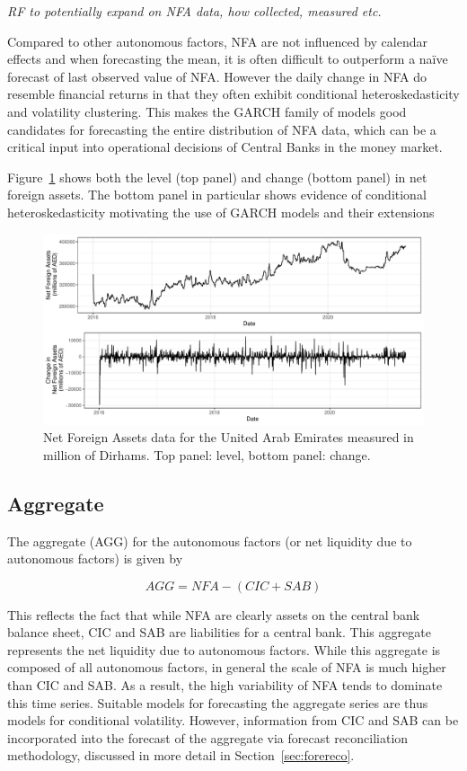 \documentclass{article}
\begin{document}
\textit{\color{blue} RF to potentially expand on NFA data, how collected, measured etc.}

Compared to other autonomous factors, NFA are not influenced by calendar effects and when forecasting the mean, it is often difficult to outperform a na\"ive forecast of last observed value of NFA. However the daily change in NFA do resemble financial returns in that they often exhibit conditional heteroskedasticity and volatility clustering. This makes the GARCH family of models good candidates for forecasting the entire distribution of NFA data, which can be a critical input into operational decisions of Central Banks in the money market.

Figure~\ref{fig:nfadata} shows both the level (top panel) and change (bottom panel) in net foreign assets. The bottom panel in particular shows evidence of conditional heteroskedasticity motivating the use of GARCH models and their extensions

\begin{figure}[!h]
    \centering
    \includegraphics[scale=0.6]{nfaplot}
    \caption{Net Foreign Assets data for the United Arab Emirates measured in million of Dirhams. Top panel: level, bottom panel: change.}
    \label{fig:nfadata}
\end{figure}

\subsection{Aggregate}

The aggregate (AGG) for the autonomous factors (or net liquidity due to autonomous factors) is given by 

\[
AGG=NFA-(CIC+SAB)
\]

This reflects the fact that while NFA are clearly assets on the central bank balance sheet, CIC and SAB are liabilities for a central bank. This aggregate represents the net liquidity due to autonomous factors. While this aggregate is composed of all autonomous factors, in general the scale of NFA is much higher than CIC and SAB. As a result, the high variability of NFA tends to dominate this time series. Suitable models for forecasting the aggregate series are thus models for conditional volatility. However, information from CIC and SAB can be incorporated into the forecast of the aggregate via forecast reconciliation methodology, discussed in more detail in Section~\ref{sec:forereco}.
\end{document}
